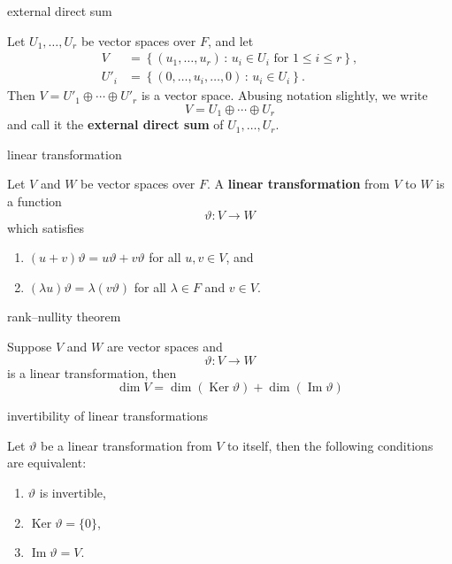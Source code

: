 \documentclass[avery5371,grid]{flashcards}
\renewcommand{\le}{\leqslant}
\renewcommand{\theta}{\vartheta}
\newcommand{\set}[2]{\ensuremath{\left\{ #1 \, : \, #2 \right\}}}
\DeclareMathOperator{\Ker}{\ensuremath{\textrm{Ker}}}
\DeclareMathOperator{\Img}{\ensuremath{\textrm{Im}}}
\newcommand{\defn}[1]{\textbf{#1}}
\begin{document}
\begin{flashcard}[Definition]{external direct sum}

  Let $U_1, \ldots, U_r$ be vector spaces over $F$, and let
  \begin{align*}
    V &= \set{(u_1, \ldots, u_r)}{u_i \in U_i \text{ for } 1 \le i \le r},\\
    U'_i &= \set{(0, \ldots, u_i, \ldots, 0)}{u_i \in U_i}.
  \end{align*}
  Then $V = U'_1 \oplus \cdots \oplus U'_r$ is a vector space. Abusing
  notation slightly, we write
  \[
    V = U_1 \oplus \cdots \oplus U_r
  \]
  and call it the \defn{external direct sum} of $U_1, \ldots, U_r$.
\end{flashcard}

\begin{flashcard}[Definition]{linear transformation}

  Let $V$ and $W$ be vector spaces over $F$. A \defn{linear
    transformation} from $V$ to $W$ is a function
  \[
    \theta : V \to W
  \]
  which satisfies
  \begin{enumerate}
  \item $(u + v)\theta = u\theta + v\theta$ for all $u,v \in V$, and
  \item $(\lambda u)\theta = \lambda (v\theta)$ for all
    $\lambda \in F$ and $v \in V$.
  \end{enumerate}

\end{flashcard}

\begin{flashcard}[Theorem]{rank--nullity theorem}

  Suppose $V$ and $W$ are vector spaces and
  \[
    \theta : V \to W
  \]
  is a linear transformation, then
  \[
    \dim V = \dim(\Ker \theta) + \dim(\Img \theta)
  \]

\end{flashcard}

\begin{flashcard}[Theorem 2.14]{invertibility of linear
    transformations}

  Let $\theta$ be a linear transformation from $V$ to itself, then the
  following conditions are equivalent:
  \begin{enumerate}
  \item $\theta$ is invertible,
  \item $\Ker \theta = \{ 0 \}$,
  \item $\Img \theta  = V$.
  \end{enumerate}

\end{flashcard}
\end{document}
